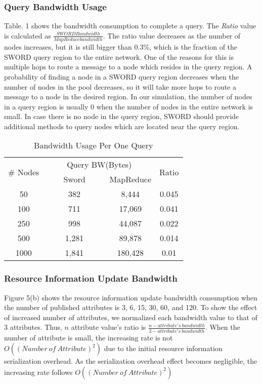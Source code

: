 \documentclass{acm_proc_article-sp}
\begin{document}
\subsubsection{Query Bandwidth Usage}
Table. 1 shows the bandwidth consumption to complete a query. The \textit{Ratio} value is calculated as \begin{math}\frac{SWORD Bandwidth}{MapReduce bandwidth}\end{math}. The ratio value decreases as the number of nodes
increases, but it is still bigger than 0.3\%, which is the fraction of the SWORD query region to the entire network. One of the reasons for this is multiple hops to route a message to a node which resides in the query region.
A probability of finding a node in a SWORD query region decreases when the number of nodes in the pool decreases, so it will take more hops to route a message to a node in the desired region. 
In our simulation, the number of nodes in a query region is usually 0 when the number of nodes in the entire network is small. 
In case there is no node in the query region, SWORD should provide additional methods to query nodes which are located near the query region.
\begin{table}
\centering
\caption{Bandwidth Usage Per One Query}
\begin{center}
\begin{tabular}{|c|c|c|c|} \hline
\multirow{2}{*}{\# Nodes}&\multicolumn{2}{|c|}{Query BW(Bytes)}&\multirow{2}{*}{Ratio} \\ \cline{2-3}
\ &\ \ \ \ Sword\ \ \ \ &MapReduce& \\ \hline\hline
50&382&8,444&0.045\\ \hline
100&711&17,069&0.041\\ \hline
250&998&44,087&0.022\\ \hline
500&1,281&89,878&0.014\\ \hline
1000&1,841&180,428&0.01\\ \hline
\end{tabular}
\end{center}
\end{table}
\subsubsection{Resource Information Update Bandwidth}
Figure 5(b) shows the resource information update bandwidth consumption when the number of published attributes is 3, 6, 15, 30, 60, and 120. 
To show the effect of increased number of attributes, we normalized each bandwidth value to that of 3 attributes.
Thus, $n$ attribute value's ratio is \begin{math}\frac{n-attribute's\ bandwidth}{3-attribute's\ bandwidth}\end{math}. 
When the number of attribute is small, the increasing rate is not $O((Number\ of\ Attribute)^2)$ due to the initial resource information serialization overhead.
As the serialization overhead effect becomes negligible, the increasing rate follows $O((Number\ of\ Attribute)^2)$
\end{document}
